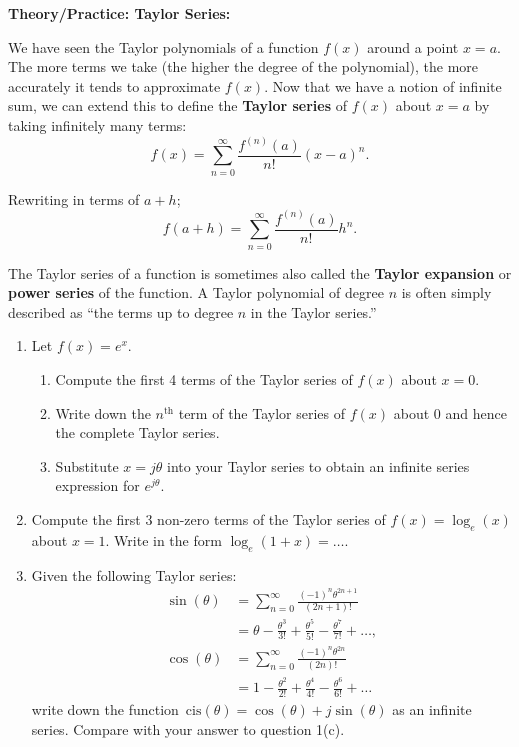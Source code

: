 \documentclass{article}
\newcommand{\cis}{\,\mathrm{cis}}
\begin{document}
\clearpage













\textbf{Theory/Practice: Taylor Series:}


We have seen the Taylor polynomials of a function $f(x)$ around a point $x=a$. The more terms we take (the higher the degree of the polynomial), the more accurately it tends to approximate $f(x)$. Now that we have a notion of infinite sum, we can extend this to define the \textbf{Taylor series} of $f(x)$ about $x=a$ by taking infinitely many terms:
\[f(x)=\sum_{n=0}^\infty \frac{f^{(n)}(a)}{n!}(x-a)^n.\]

Rewriting in terms of $a+h$;
\[f(a+h)=\sum_{n=0}^\infty \frac{f^{(n)}(a)}{n!}h^n.\]

The Taylor series of a function is sometimes also called the \textbf{Taylor expansion} or \textbf{power series} of the function. A Taylor polynomial of degree $n$ is often simply described as ``the terms up to degree $n$ in the Taylor series.''


\begin{enumerate}
	\item Let $f(x)=e^x$.
		\begin{enumerate}
			\item Compute the first 4 terms of the Taylor series of $f(x)$ about $x=0$.
			\item Write down the $n^\mathrm{th}$ term of the Taylor series of $f(x)$ about $0$ and hence the complete Taylor series.
			\item Substitute $x=j\theta$ into your Taylor series to obtain an infinite series expression for $e^{j\theta}$.
		\end{enumerate}
	\item Compute the first 3 non-zero terms of the Taylor series of $f(x)=\log_e(x)$ about $x=1$. Write in the form $\log_e(1+x)=\hdots$.
	\item Given the following Taylor series:
		\begin{align*}
		\sin(\theta)&=\sum_{n=0}^\infty \frac{(-1)^{n}\theta^{2n+1}}{(2n+1)!}\\
		&=\theta-\frac{\theta^3}{3!}+\frac{\theta^5}{5!}-\frac{\theta^7}{7!}+\hdots,\\
		\cos(\theta)&=\sum_{n=0}^\infty \frac{(-1)^n\theta^{2n}}{(2n)!}\\
		&= 1-\frac{\theta^2}{2!}+\frac{\theta^4}{4!}-\frac{\theta^6}{6!}+\hdots
		\end{align*}
		write down the function $\cis(\theta)=\cos(\theta)+j\sin(\theta)$ as an infinite series. Compare with your answer to question 1(c).
\end{enumerate}
\end{document}
